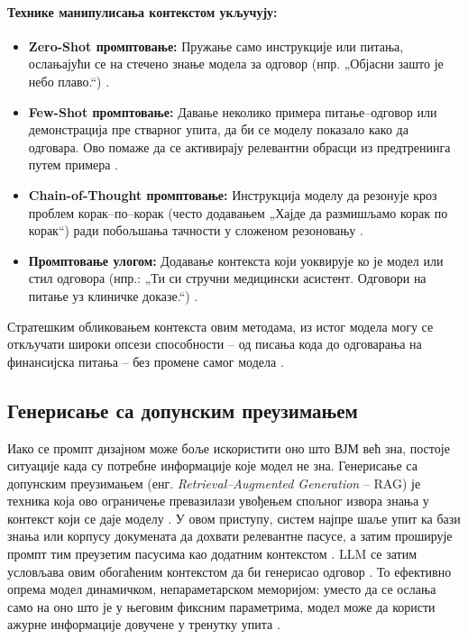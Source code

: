 \documentclass[a4paper, 12pt, master, utf8]{etf}
\begin{document}
\paragraph{Технике манипулисања контекстом укључују:}

\begin{itemize}
  \item \textbf{Zero-Shot промптовање:} Пружање само инструкције или питања, ослањајући се на стечено знање модела за одговор (нпр. „Објасни зашто је небо плаво.“) \cite{sahoo_systematic_2025}.
  \item \textbf{Few-Shot промптовање:} Давање неколико примера питање--одговор или демонстрација пре стварног упита, да би се моделу показало како да одговара. Ово помаже да се активирају релевантни обрасци из предтренинга путем примера \cite{sahoo_systematic_2025}.
  \item \textbf{Chain-of-Thought промптовање:} Инструкција моделу да резонује кроз проблем корак--по--корак (често додавањем „Хајде да размишљамо корак по корак“) ради побољшања тачности у сложеном резоновању \cite{sahoo_systematic_2025}.
  \item \textbf{Промптовање улогом:} Додавање контекста који уоквирује ко је модел или стил одговора (нпр.: „Ти си стручни медицински асистент. Одговори на питање уз клиничке доказе.“) \cite{sahoo_systematic_2025}.
\end{itemize}

Стратешким обликовањем контекста овим методама, из истог модела могу се откључати широки опсези способности – од писања кода до одговарања на финансијска питања – без промене самог модела \cite{sahoo_systematic_2025}.

\subsection{Генерисање са допунским преузимањем}

Иако се промпт дизајном може боље искористити оно што ВЈМ већ зна, постоје ситуације када су потребне информације које модел не зна. Генерисање са допунским преузимањем (енг. \textit{Retrieval--Augmented Generation} -- RAG) је техника која ово ограничење превазилази увођењем спољног извора знања у контекст који се даје моделу \cite{lewis_retrieval_2020}. У овом приступу, систем најпре шаље упит ка бази знања или корпусу докумената да дохвати релевантне пасусе, а затим проширује промпт тим преузетим пасусима као додатним контекстом \cite{lewis_retrieval_2020}. LLM се затим условљава овим обогаћеним контекстом да би генерисао одговор \cite{lewis_retrieval_2020}. То ефективно опрема модел динамичком, непараметарском меморијом: уместо да се ослања само на оно што је у његовим фиксним параметрима, модел може да користи ажурне информације довучене у тренутку упита \cite{lewis_retrieval_2020}.
\end{document}
